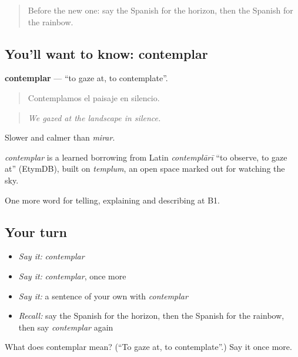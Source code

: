 \label{lesson:ES-C703-contemplar}



\begin{quote}
Before the new one: say the Spanish for the horizon, then the Spanish for the rainbow.
\end{quote}

\subsection*{You'll want to know: contemplar}
\textbf{contemplar} — \textquotedblleft{}to gaze at, to contemplate\textquotedblright{}.

\begin{quote}
Contemplamos el paisaje en silencio.
\end{quote}

\begin{quote}
\emph{We gazed at the landscape in silence.}
\end{quote}

Slower and calmer than \emph{mirar}.

\begin{cousinweb}
\emph{contemplar} is a learned borrowing from Latin \emph{contemplārī} \textquotedblleft{}to observe, to gaze at\textquotedblright{} (EtymDB), built on \emph{templum}, an open space marked out for watching the sky.
\end{cousinweb}

\begin{grammarlens}[title={What you've built}]
One more word for telling, explaining and describing at B1.
\end{grammarlens}

\subsection*{Your turn}
\begin{itemize}
\raggedright
  \item \emph{Say it:} \emph{contemplar}
  \item \emph{Say it:} \emph{contemplar}, once more
  \item \emph{Say it:} a sentence of your own with \emph{contemplar}
  \item \emph{Recall:} say the Spanish for the horizon, then the Spanish for the rainbow, then say \emph{contemplar} again
\end{itemize}

\begin{tcolorbox}[breakable,colback=teal!4,colframe=teal!35!black,title={Before you move on}]
What does contemplar mean? (\textquotedblleft{}To gaze at, to contemplate\textquotedblright{}.) Say it once more.
\end{tcolorbox}
